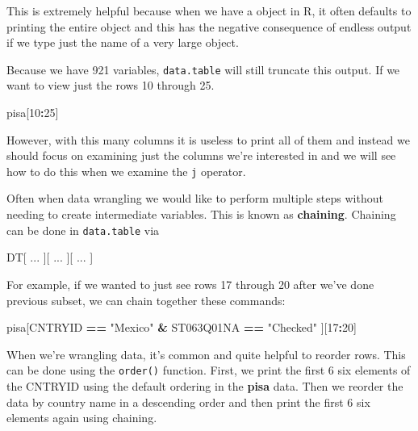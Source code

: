 \documentclass[]{book}
\newenvironment{Shaded}{\begin{snugshade}}{\end{snugshade}}
\newcommand{\DecValTok}[1]{\textcolor[rgb]{0.00,0.00,0.81}{#1}}
\newcommand{\NormalTok}[1]{#1}
\newcommand{\OperatorTok}[1]{\textcolor[rgb]{0.81,0.36,0.00}{\textbf{#1}}}
\newcommand{\StringTok}[1]{\textcolor[rgb]{0.31,0.60,0.02}{#1}}
\begin{document}
This is extremely helpful because when we have a object in R, it often defaults to printing the entire object and this has the negative consequence of endless output if we type just the name of a very large object.

Because we have 921 variables, \texttt{data.table} will still truncate this output. If we want to view just the rows 10 through 25.

\begin{Shaded}
\begin{Highlighting}[]
\NormalTok{pisa[}\DecValTok{10}\OperatorTok{:}\DecValTok{25}\NormalTok{]}
\end{Highlighting}
\end{Shaded}

However, with this many columns it is useless to print all of them and instead we should focus on examining just the columns we're interested in and we will see how to do this when we examine the \texttt{j} operator.

Often when data wrangling we would like to perform multiple steps without needing to create intermediate variables. This is known as \textbf{chaining}. Chaining can be done in \texttt{data.table} via

\begin{Shaded}
\begin{Highlighting}[]
\NormalTok{DT[ ...}
\NormalTok{   ][ ...}
\NormalTok{     ][ ...}
\NormalTok{       ]}
\end{Highlighting}
\end{Shaded}

For example, if we wanted to just see rows 17 through 20 after we've done previous subset, we can chain together these commands:

\begin{Shaded}
\begin{Highlighting}[]
\NormalTok{pisa[CNTRYID }\OperatorTok{==}\StringTok{ "Mexico"} \OperatorTok{&}\StringTok{ }\NormalTok{ST063Q01NA }\OperatorTok{==}\StringTok{ "Checked"}
\NormalTok{     ][}\DecValTok{17}\OperatorTok{:}\DecValTok{20}\NormalTok{]}
\end{Highlighting}
\end{Shaded}

When we're wrangling data, it's common and quite helpful to reorder rows. This can be done using the \texttt{order()} function. First, we print the first 6 six elements of the CNTRYID using the default ordering in the \textbf{pisa} data. Then we reorder the data by country name in a descending order and then print the first 6 six elements again using chaining.
\end{document}
